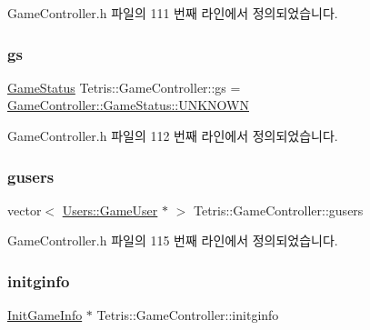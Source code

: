Game\+Controller.\+h 파일의 111 번째 라인에서 정의되었습니다.

\mbox{\label{class_tetris_1_1_game_controller_ae4c894005a82404c73a5a9a6efb208dc}} 
\subsubsection{\texorpdfstring{gs}{gs}}
{\footnotesize\ttfamily \hyperlink{class_tetris_1_1_game_controller_a96a963b56385f3b3a122ff0ca2beb770}{Game\+Status} Tetris\+::\+Game\+Controller\+::gs = \hyperlink{class_tetris_1_1_game_controller_a96a963b56385f3b3a122ff0ca2beb770a696b031073e74bf2cb98e5ef201d4aa3}{Game\+Controller\+::\+Game\+Status\+::\+U\+N\+K\+N\+O\+WN}\hspace{0.3cm}{\ttfamily [protected]}}



Game\+Controller.\+h 파일의 112 번째 라인에서 정의되었습니다.

\mbox{\label{class_tetris_1_1_game_controller_a1a31d3a933daad6d95e20458eea2900e}} 
\subsubsection{\texorpdfstring{gusers}{gusers}}
{\footnotesize\ttfamily vector$<$ \hyperlink{class_tetris_1_1_users_1_1_game_user}{Users\+::\+Game\+User} $\ast$ $>$ Tetris\+::\+Game\+Controller\+::gusers\hspace{0.3cm}{\ttfamily [protected]}}



Game\+Controller.\+h 파일의 115 번째 라인에서 정의되었습니다.

\mbox{\label{class_tetris_1_1_game_controller_adaefa9bbdd0d73ec58173dce327373ca}} 
\subsubsection{\texorpdfstring{initginfo}{initginfo}}
{\footnotesize\ttfamily \hyperlink{class_tetris_1_1_init_game_info}{Init\+Game\+Info} $\ast$ Tetris\+::\+Game\+Controller\+::initginfo\hspace{0.3cm}{\ttfamily [protected]}}




